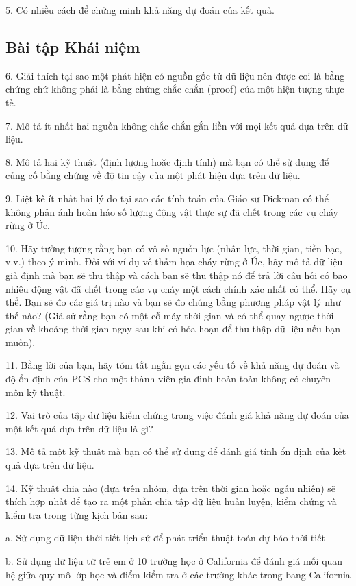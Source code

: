 5. Có nhiều cách để chứng minh khả năng dự đoán của kết quả.

\subsection*{Bài tập Khái niệm}
6. Giải thích tại sao một phát hiện có nguồn gốc từ dữ liệu nên được coi là bằng chứng chứ không phải là bằng chứng chắc chắn (proof) của một hiện tượng thực tế.

7. Mô tả ít nhất hai nguồn không chắc chắn gắn liền với mọi kết quả dựa trên dữ liệu.

8. Mô tả hai kỹ thuật (định lượng hoặc định tính) mà bạn có thể sử dụng để củng cố bằng chứng về độ tin cậy của một phát hiện dựa trên dữ liệu.

9. Liệt kê ít nhất hai lý do tại sao các tính toán của Giáo sư Dickman có thể không phản ánh hoàn hảo số lượng động vật thực sự đã chết trong các vụ cháy rừng ở Úc.

10. Hãy tưởng tượng rằng bạn có vô số nguồn lực (nhân lực, thời gian, tiền bạc, v.v.) theo ý mình. Đối với ví dụ về thảm họa cháy rừng ở Úc, hãy mô tả dữ liệu giả định mà bạn sẽ thu thập và cách bạn sẽ thu thập nó để trả lời câu hỏi có bao nhiêu động vật đã chết trong các vụ cháy một cách chính xác nhất có thể. Hãy cụ thể. Bạn sẽ đo các giá trị nào và bạn sẽ đo chúng bằng phương pháp vật lý như thế nào? (Giả sử rằng bạn có một cỗ máy thời gian và có thể quay ngược thời gian về khoảng thời gian ngay sau khi có hỏa hoạn để thu thập dữ liệu nếu bạn muốn).

11. Bằng lời của bạn, hãy tóm tắt ngắn gọn các yếu tố về khả năng dự đoán và độ ổn định của PCS cho một thành viên gia đình hoàn toàn không có chuyên môn kỹ thuật.

12. Vai trò của tập dữ liệu kiểm chứng trong việc đánh giá khả năng dự đoán của một kết quả dựa trên dữ liệu là gì?

13. Mô tả một kỹ thuật mà bạn có thể sử dụng để đánh giá tính ổn định của kết quả dựa trên dữ liệu.

14. Kỹ thuật chia nào (dựa trên nhóm, dựa trên thời gian hoặc ngẫu nhiên) sẽ thích hợp nhất để tạo ra một phần chia tập dữ liệu huấn luyện, kiểm chứng và kiểm tra trong từng kịch bản sau:

a. Sử dụng dữ liệu thời tiết lịch sử để phát triển thuật toán dự báo thời tiết

b. Sử dụng dữ liệu từ trẻ em ở 10 trường học ở California để đánh giá mối quan hệ giữa quy mô lớp học và điểm kiểm tra ở các trường khác trong bang California

